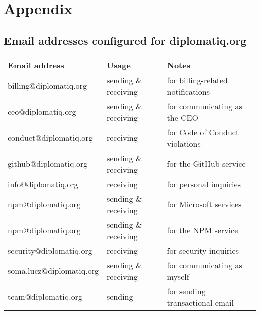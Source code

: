 \appendix
\chapter*{Appendix}
{}
\renewcommand{\thesection}{\Alph{section}}

\section{Email addresses configured for diplomatiq.org}

\begin{table}[!htb]
    \centering
    \begin{tabular}{l|l|l}
        \toprule
        \textbf{Email address}      & \textbf{Usage}            & \textbf{Notes} \\
        \midrule
        billing@diplomatiq.org     & sending \& receiving      & for billing-related notifications \\
        ceo@diplomatiq.org         & sending \& receiving      & for communicating as the CEO \\
        conduct@diplomatiq.org     & receiving                 & for Code of Conduct violations \\
        github@diplomatiq.org      & sending \& receiving      & for the GitHub service \\
        info@diplomatiq.org        & receiving                 & for personal inquiries \\
        npm@diplomatiq.org         & sending \& receiving      & for Microsoft services \\
        npm@diplomatiq.org         & sending \& receiving      & for the NPM service \\
        security@diplomatiq.org    & receiving                 & for security inquiries \\
        soma.lucz@diplomatiq.org   & sending \& receiving      & for communicating as myself \\
        team@diplomatiq.org        & sending                   & for sending transactional email \\
        \bottomrule
    \end{tabular}
\end{table}
